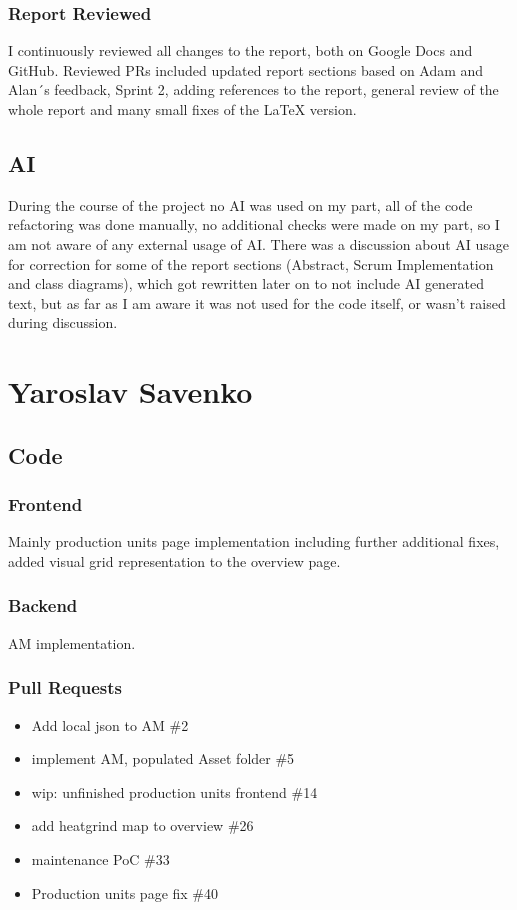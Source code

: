 \subsubsection*{Report Reviewed}
I continuously reviewed all changes to the report, both on Google Docs and GitHub. Reviewed PRs included updated report sections based on Adam and Alan´s feedback, Sprint 2, adding references to the report, general review of the whole report and many small fixes of the LaTeX version. 
\subsection*{AI}
During the course of the project no AI was used on my part, all of the code refactoring was done manually, no additional checks were made on my part, so I am not aware of any external usage of AI. There was a discussion about AI usage for correction for some of the report sections (Abstract, Scrum Implementation and class diagrams), which got rewritten later on to not include AI generated text, but as far as I am aware it was not used for the code itself, or wasn’t raised during discussion.
\section*{Yaroslav Savenko}
\subsection*{Code}
\subsubsection*{Frontend}
Mainly production units page implementation including further additional fixes, added visual grid representation to the overview page.
\subsubsection*{Backend}
AM implementation.
\subsubsection*{Pull Requests}
\begin{itemize}
    \item Add local json to AM \#2
    \item implement AM, populated Asset folder \#5
    \item wip: unfinished production units frontend \#14
    \item add heatgrind map to overview \#26
    \item maintenance PoC \#33
    \item Production units page fix \#40
\end{itemize}
